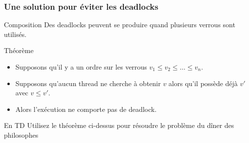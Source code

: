 
\begingroup

\begin{frame}
  \frametitle{Une solution pour éviter les deadlocks}
  \vFill
  \begin{alertblock}{Composition}
    Des deadlocks peuvent se produire quand plusieurs verrous sont utilisés.
  \end{alertblock}
  \vFill
  \begin{block}{Théorème}
    \begin{itemize}
    \item Supposons qu'il y a un ordre sur les verrous $v_1 \le v_2 \le \dots \le v_n$.
    \item Supposons qu'aucun thread ne cherche à obtenir $v$ alors qu'il possède déjà $v'$ avec $v\le v'$.
    \item Alors l'exécution ne comporte pas de deadlock.
    \end{itemize}
  \end{block}

  \vFill
  \begin{alertblock}{En TD}
    Utilisez le théorème ci-dessus pour résoudre le problème du dîner des philosophes
  \end{alertblock}
  \vFill
\end{frame}

\endgroup
\endinput
